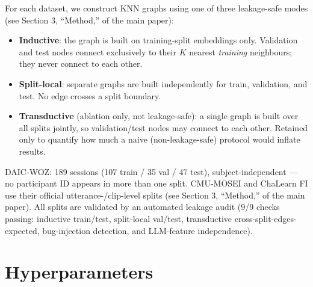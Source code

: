 \documentclass[letterpaper]{article}
\begin{document}
For each dataset, we construct KNN graphs using one of three leakage-safe modes (see Section 3, ``Method,'' of the main paper):

\begin{itemize}
    \item \textbf{Inductive}: the graph is built on training-split embeddings only. Validation and test nodes connect exclusively to their $K$ nearest \emph{training} neighbours; they never connect to each other.
    \item \textbf{Split-local}: separate graphs are built independently for train, validation, and test. No edge crosses a split boundary.
    \item \textbf{Transductive} (ablation only, not leakage-safe): a single graph is built over all splits jointly, so validation/test nodes may connect to each other. Retained only to quantify how much a naive (non-leakage-safe) protocol would inflate results.
\end{itemize}

DAIC-WOZ: 189 sessions (107 train / 35 val / 47 test), subject-independent — no participant ID appears in more than one split. CMU-MOSEI and ChaLearn FI use their official utterance-/clip-level splits (see Section 3, ``Method,'' of the main paper). All splits are validated by an automated leakage audit (9/9 checks passing: inductive train/test, split-local val/test, transductive cross-split-edges-expected, bug-injection detection, and LLM-feature independence).

\section{Hyperparameters}
\end{document}
